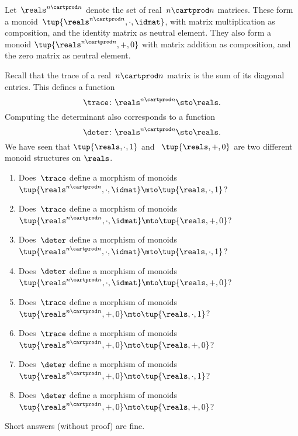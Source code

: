 \begin{gradedexercise}
    \label{ex:TraceAndDeterminant}
    Let~$\reals^{n \cartprod n}$ denote the set of real~$n \cartprod n$ matrices.
    These form a monoid~$\tup{\reals^{n \cartprod n}, \cdot, \idmat}$, with matrix multiplication as composition, and the identity matrix as neutral element.
    They also form a monoid $\tup{\reals^{n \cartprod n}, + , 0}$ with matrix addition as composition, and the zero matrix as neutral element.
    
    Recall that the trace of a real~$n \cartprod n$ matrix is the sum of its diagonal entries.
    This defines a function
    \begin{equation}
        \trace \colon \reals^{n \cartprod n} \sto \reals.
    \end{equation}
    Computing the determinant also corresponds to a function
    \begin{equation}
        \deter \colon \reals^{n \cartprod n} \sto \reals.
    \end{equation}
    We have seen that $\tup{ \reals, \cdot, 1}$ and ~$\tup{ \reals, +, 0}$ are two different monoid structures on $\reals$.
    \begin{enumerate}
        \item Does~$\trace$ define a morphism of monoids~$\tup{\reals^{n \cartprod n}, \cdot, \idmat} \mto \tup{ \reals, \cdot, 1}$?
        \item Does~$\trace$ define a morphism of monoids~$\tup{\reals^{n \cartprod n}, \cdot, \idmat} \mto \tup{ \reals, + , 0}$?
        \item Does~$\deter$ define a morphism of monoids~$\tup{\reals^{n \cartprod n}, \cdot, \idmat} \mto \tup{ \reals, \cdot, 1}$?
        \item Does~$\deter$ define a morphism of monoids~$\tup{\reals^{n \cartprod n}, \cdot, \idmat} \mto \tup{ \reals, + , 0}$?
        \item Does~$\trace$ define a morphism of monoids~$\tup{\reals^{n \cartprod n}, +, 0} \mto \tup{ \reals, \cdot, 1}$?
        \item Does~$\trace$ define a morphism of monoids~$\tup{\reals^{n \cartprod n}, +, 0} \mto \tup{ \reals, + , 0}$?
        \item Does~$\deter$ define a morphism of monoids~$\tup{\reals^{n \cartprod n}, +, 0} \mto \tup{ \reals, \cdot, 1}$?
        \item Does~$\deter$ define a morphism of monoids~$\tup{\reals^{n \cartprod n}, +, 0} \mto \tup{ \reals, + , 0}$?
    \end{enumerate}
    Short answers (without proof) are fine.
\end{gradedexercise}


